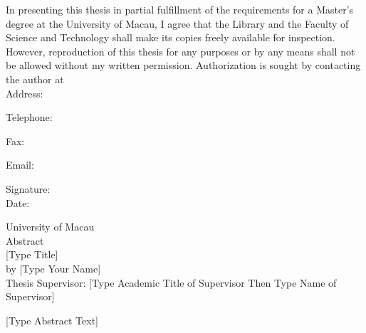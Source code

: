 \begin{titlepage}
\newpage
\thispagestyle{umempty}
\vspace*{4\baselineskip}
{ In presenting this thesis in partial fulfillment of the requirements for a Master's degree at the University of Macau, I agree that the Library and the Faculty of Science and Technology shall make its copies freely available for inspection. However, reproduction of this thesis for any purposes or by any means shall not be allowed without my written permission.
Authorization is sought by contacting the author at}\\[2\baselineskip]
\mbox{\qquad} Address:\par
\mbox{\qquad} Telephone:\par
\mbox{\qquad} Fax:\par
\mbox{\qquad} Email: \par
\mbox{\hspace{24em}}Signature:\underline{\hspace*{2.6cm}} \\[\baselineskip]
\mbox{\hspace{24em}} Date:\underline{\hspace*{3.3cm}}

\newpage
\thispagestyle{umempty}
\begin{center}
\vspace*{5\baselineskip}
\textit{}
\end{center}

\newpage
\thispagestyle{umempty}
\vspace*{1\baselineskip}
\begin{center}
\large University of Macau \\ [1\baselineskip]
Abstract \\ [2\baselineskip]
[Type Title] \\ [1\baselineskip]
by [Type Your Name] \\ [1\baselineskip]
Thesis Supervisor: [Type Academic Title of Supervisor Then Type Name of Supervisor]
\end{center}
[Type Abstract Text]

\afterpage{\thispagestyle{umempty}\null\newpage}
\end{titlepage}
